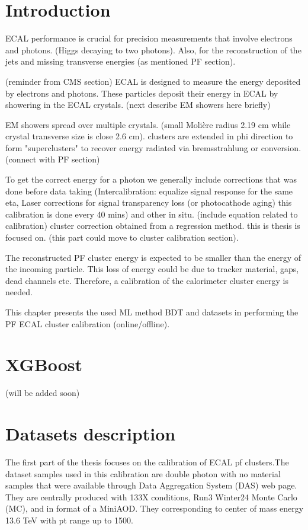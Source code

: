 
\section{Introduction}

ECAL performance is crucial for precision measurements that involve electrons and photons. 
(Higgs decaying to two photons). Also, for the reconstruction of the jets and missing transverse energies (as mentioned PF section).

(reminder from CMS section) ECAL is designed to measure the energy deposited by electrons and photons. These particles deposit their energy in ECAL by showering in the ECAL crystals. (next describe EM showers here briefly)

EM showers spread over multiple crystals. (small Molière radius 2.19 cm while crystal transverse size is close 2.6 cm). clusters are extended in phi direction to form "superclusters" to recover energy radiated via bremsstrahlung or conversion. (connect with PF section)

To get the correct energy for a photon we generally include corrections that was done before data taking (Intercalibration: equalize signal response for the same eta, Laser corrections for signal transparency loss (or photocathode aging) this calibration is done every 40 mins) and other in situ. (include equation related to calibration) cluster correction obtained from a regression method. this is thesis is focused on. (this part could move to cluster calibration section).

The reconstructed PF cluster energy is expected to be smaller than the energy of the incoming particle. This loss of energy could be due to tracker material, gaps, dead channels etc. Therefore, a calibration of the calorimeter cluster energy is needed.

This chapter presents the used ML method BDT and datasets in performing the PF ECAL cluster calibration (online/offline).  


\section{XGBoost}

(will be added soon)

\section{Datasets description}

The first part of the thesis focuses on the calibration of ECAL pf clusters.The dataset samples used in this calibration are double photon with no material samples that were available through Data Aggregation System (DAS) web page.   
They are centrally produced with 133X %
conditions, Run3 Winter24 Monte Carlo (MC), and in format of a MiniAOD. They corresponding to center of mass energy 13.6 TeV with pt range up to 1500.  


